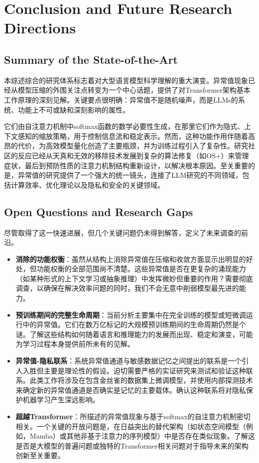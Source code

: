 \documentclass{article}
\begin{document}
\section{Conclusion and Future Research Directions}

\subsection{Summary of the State-of-the-Art}

本综述综合的研究体系标志着对大型语言模型科学理解的重大演变。异常值现象已经从模型压缩的外围关注点转变为一个中心话题，提供了对Transformer架构基本工作原理的深刻见解。关键要点很明确：异常值不是随机噪声，而是LLMs的系统、功能上不可或缺和深刻影响的属性。

它们由自注意力机制中softmax函数的数学必要性生成，在那里它们作为隐式、上下文感知的缩放策略，用于控制信息流和稳定表示。然而，这种功能作用伴随着高昂的代价，为高效模型量化创造了主要瓶颈，并为训练过程引入了复杂性。研究社区的反应已经从天真和无效的移除技术发展到复杂的算法修复（如OS+）来管理症状，最后到预防性质的注意力机制结构重新设计，以解决根本原因。至关重要的是，异常值的研究提供了一个强大的统一镜头，连接了LLM研究的不同领域，包括计算效率、优化理论以及隐私和安全的关键领域。

\subsection{Open Questions and Research Gaps}

尽管取得了这一快速进展，但几个关键问题仍未得到解答，定义了未来调查的前沿。
  
  \begin{itemize}
  \item \textbf{消除的功能权衡}：虽然从结构上消除异常值在压缩和收敛方面显示出明显的好处，但功能权衡的全部范围尚不清楚。这些异常值是否在更复杂的涌现能力（如某种形式的上下文学习或抽象推理）中发挥微妙但重要的作用？需要彻底调查，以确保在解决效率问题的同时，我们不会无意中削弱模型最先进的能力。
  \item \textbf{预训练期间的完整生命周期}：当前分析主要集中在完全训练的模型或短微调运行中的异常值。它们在数万亿标记的大规模预训练期间的生命周期仍然是个谜。了解这些结构如何随着语言和推理能力的发展而出现、稳定和演变，可能为学习过程本身提供前所未有的见解。
  \item \textbf{异常值-隐私联系}：系统异常值通道与敏感数据记忆之间提出的联系是一个引人入胜但主要是理论性的假设。迫切需要严格的实证研究来测试和验证这种联系。此类工作将涉及在包含金丝雀的数据集上微调模型，并使用内部探测技术来确定新的异常值通道是否确实是记忆的主要载体。确认这种联系将对隐私保护机器学习产生深远影响。
  \item \textbf{超越Transformer}：所描述的异常值现象与基于softmax的自注意力机制密切相关。一个关键的开放问题是，在日益突出的替代架构（如状态空间模型（例如，Mamba）或其他非基于注意力的序列模型）中是否存在类似现象。了解这是否是大模型的普遍问题或独特的Transformer相关问题对于指导未来的架构创新至关重要。
  \end{itemize}
\end{document}
